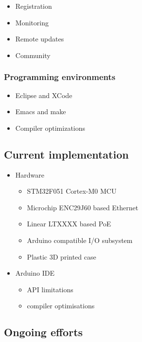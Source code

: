 \documentclass[draft,a4paper]{siamltex}
\begin{document}
\begin{itemize}
\item Registration
\item Monitoring
\item Remote updates
\item Community
\end{itemize}

\subsubsection{Programming environments}

\begin{itemize}
\item Eclipse and XCode
\item Emacs and make
\item Compiler optimizations
\end{itemize}

\subsection{Current implementation}

\begin{itemize}
  \item Hardware
    \begin{itemize}
    \item STM32F051 Cortex-M0 MCU
    \item Microchip ENC29J60 based Ethernet
    \item Linear LTXXXX based PoE
    \item Arduino compatible I/O subsystem
    \item Plastic 3D printed case
    \end{itemize}
  \item Arduino IDE
    \begin{itemize}
    \item API limitations
    \item compiler optimisations
    \end{itemize}
\end{itemize}

\subsection{Ongoing efforts}
\end{document}
